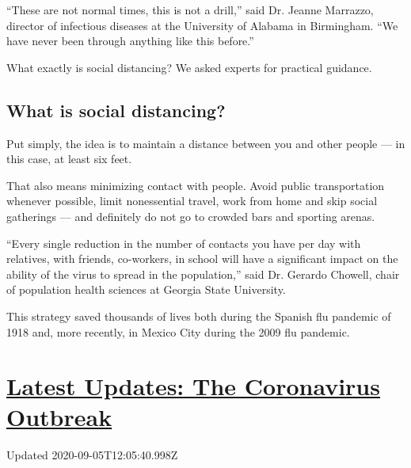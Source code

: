 ``These are not normal times, this is not a drill,'' said Dr. Jeanne
Marrazzo, director of infectious diseases at the University of Alabama
in Birmingham. ``We have never been through anything like this before.''

What exactly is social distancing? We asked experts for practical
guidance.

\hypertarget{what-is-social-distancing}{%
\subsection{What is social
distancing?}\label{what-is-social-distancing}}

Put simply, the idea is to maintain a distance between you and other
people --- in this case, at least six feet.

That also means minimizing contact with people. Avoid public
transportation whenever possible, limit nonessential travel, work from
home and skip social gatherings --- and definitely do not go to crowded
bars and sporting arenas.

``Every single reduction in the number of contacts you have per day with
relatives, with friends, co-workers, in school will have a significant
impact on the ability of the virus to spread in the population,'' said
Dr. Gerardo Chowell, chair of population health sciences at Georgia
State University.

This strategy saved thousands of lives both during the Spanish flu
pandemic of 1918 and, more recently, in Mexico City during the 2009 flu
pandemic.

\hypertarget{latest-updates-the-coronavirus-outbreak}{%
\section{\texorpdfstring{\href{https://www.nytimes3xbfgragh.onion/2020/09/04/world/covid-19-coronavirus.html?action=click\&pgtype=Article\&state=default\&region=MAIN_CONTENT_1\&context=storylines_live_updates}{Latest
Updates: The Coronavirus
Outbreak}}{Latest Updates: The Coronavirus Outbreak}}\label{latest-updates-the-coronavirus-outbreak}}

Updated 2020-09-05T12:05:40.998Z

